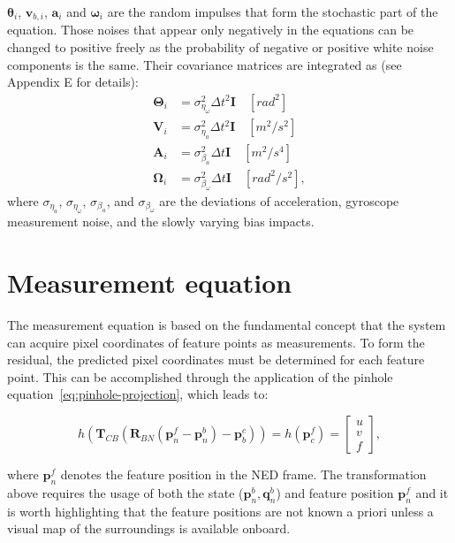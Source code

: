 $\boldsymbol{\theta}_i$, $\mathbf{v}_{b,i}$, $\mathbf{a}_i$ and $\boldsymbol{\omega}_i$ are the random impulses that form the stochastic part of the equation. Those noises that appear only negatively in the equations can be changed to positive freely as the probability of negative or positive white noise components is the same. Their covariance matrices are integrated as (see~\cite{quaternion-eskf} Appendix E for details):
\begin{equation}
\begin{aligned}
    \boldsymbol{\Theta}_i&=\sigma_{\eta_\omega}^2\Delta t^2\mathbf{I} \quad [rad^2] \\
    \mathbf{V}_i&=\sigma_{\eta_a}^2\Delta t^2\mathbf{I} \quad [m^2/s^2]\\
    \mathbf{A}_i&=\sigma_{\beta_a}^2\Delta t\mathbf{I} \quad [m^2/s^4]\\
    \boldsymbol{\Omega}_i&=\sigma_{\beta_\omega}^2\Delta t\mathbf{I} \quad [rad^2/s^2],
\end{aligned}\label{eq:noises}
\end{equation}
where $\sigma_{\eta_a}$, $\sigma_{\eta_\omega}$, $\sigma_{\beta_a}$, and $\sigma_{\beta_\omega}$ are the deviations of acceleration, gyroscope measurement noise, and the slowly varying bias impacts.

\section{Measurement equation}

The measurement equation is based on the fundamental concept that the system can acquire pixel coordinates of feature points as measurements. To form the residual, the predicted pixel coordinates must be determined for each feature point. This can be accomplished through the application of the pinhole equation~\eqref{eq:pinhole-projection}, which leads to:

\begin{equation}
    h(\mathbf{T}_{CB}(\mathbf{R}_{BN}(\mathbf{p}_n^f-\mathbf{p}_n^b)-\mathbf{p}_b^c))=
    h(\mathbf{p}_c^f)=
    \begin{bmatrix}
        u \\ v \\ f
    \end{bmatrix}, 
\end{equation}

where $\mathbf{p}_n^f$ denotes the feature position in the NED frame. The transformation above requires the usage of both the state ($\mathbf{p}_n^b, \mathbf{q}_n^b$) and feature position $\mathbf{p}_n^f$ and it is worth highlighting that the feature positions are not known a priori unless a visual map of the surroundings is available onboard.

